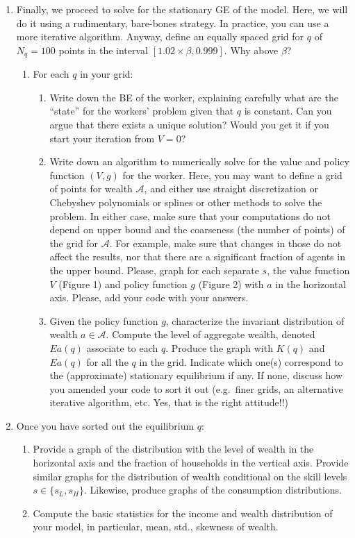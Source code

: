 \documentclass{article}
\begin{document}
\begin{enumerate}
    \item Finally, we proceed to solve for the stationary GE of the model. Here, we will do it using a rudimentary, bare-bones strategy. In practice, you can use a more iterative algorithm. Anyway, define an equally spaced grid for $q$ of $N_{q}=100$ points in the interval $[1.02\times\beta, 0.999]$. Why above $\beta$?
    \begin{enumerate}
        \item For each $q$ in your grid:
        \begin{enumerate}
            \item Write down the BE of the worker, explaining carefully what are the ``state'' for the workers' problem given that $q$ is constant. Can you argue that there exists a unique solution? Would you get it if you start your iteration from $V=0$?
            \item Write down an algorithm to numerically solve for the value and policy function $(V, g)$ for the worker. Here, you may want to define a grid of points for wealth $\mathcal{A}$, and either use straight discretization or Chebyshev polynomials or splines or other methods to solve the problem. In either case, make sure that your computations do not depend on upper bound and the coarseness (the number of points) of the grid for $\mathcal{A}$. For example, make sure that changes in those do not affect the results, nor that there are a significant fraction of agents in the upper bound. Please, graph for each separate $s$, the value function $V$ (Figure 1) and policy function $g$ (Figure 2) with $a$ in the horizontal axis. Please, add your code with your answers.
            \item Given the policy function $g$, characterize the invariant distribution of wealth $a\in\mathcal{A}$. Compute the level of aggregate wealth, denoted $Ea(q)$ associate to each $q$. Produce the graph with $K(q)$ and $Ea(q)$ for all the $q$ in the grid. Indicate which one(s) correspond to the (approximate) stationary equilibrium if any. If none, discuss how you amended your code to sort it out (e.g.\ finer grids, an alternative iterative algorithm, etc. Yes, that is the right attitude!!)
        \end{enumerate}
    \end{enumerate}

    \item Once you have sorted out the equilibrium $q$:
    \begin{enumerate}
        \item Provide a graph of the distribution with the level of wealth in the horizontal axis and the fraction of households in the vertical axis. Provide similar graphs for the distribution of wealth conditional on the skill levels $s\in\{s_{L},s_{H}\}$. Likewise, produce graphs of the consumption distributions.
        \item Compute the basic statistics for the income and wealth distribution of your model, in particular, mean, std., skewness of wealth.
    \end{enumerate}
\end{enumerate}
\end{document}
